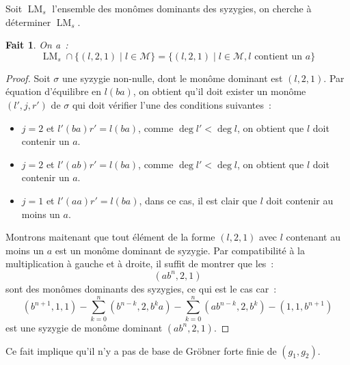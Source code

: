 \documentclass{article}
\newtheorem*{fact}{Fait}
\newcommand{\M}{\mathcal{M}}
\DeclareMathOperator{\LM}{LM}
\begin{document}
Soit $\LM_s$ l'ensemble des monômes dominants des syzygies, on cherche à déterminer $\LM_s$.
\begin{fact}
	On a~:
	$$\LM_s \cap \{(l, 2, 1) \;|\; l \in \M\} = \{(l, 2, 1) \;|\; l \in \M, l \mbox{ contient un } a\}$$
\end{fact}
\begin{proof}
	Soit $\sigma$ une syzygie non-nulle, dont le monôme dominant est $(l, 2, 1)$.
	Par équation d'équilibre en $l(ba)$, on obtient qu'il doit exister un monôme $(l', j, r')$ de $\sigma$ qui doit vérifier l'une des conditions suivantes~:
	\begin{itemize}
	\item $j = 2$ et $l'(ba)r' = l(ba)$, comme $\deg{l'} < \deg{l}$, on obtient que $l$ doit contenir un $a$.
	\item $j = 2$ et $l'(ab)r' = l(ba)$, comme $\deg{l'} < \deg{l}$, on obtient que $l$ doit contenir un $a$.
	\item $j = 1$ et $l'(aa)r' = l(ba)$, dans ce cas, il est clair que $l$ doit contenir au moins un $a$.
	\end{itemize}
	
	Montrons maitenant que tout élément de la forme $(l, 2, 1)$ avec $l$ contenant au moins un $a$ est un monôme dominant de syzygie.
	Par compatibilité à la multiplication à gauche et à droite, il suffit de montrer que les~:
	$$(ab^n, 2, 1)$$
	sont des monômes dominants des syzygies, ce qui est le cas car~:
	$$(b^{n + 1}, 1, 1) - \sum_{k = 0}^n (b^{n - k}, 2, b^k a)
	- \sum_{k = 0}^n (ab^{n - k}, 2, b^k) - (1, 1, b^{n + 1})$$
	est une syzygie de monôme dominant $(ab^n, 2, 1)$.	
\end{proof}

Ce fait implique qu'il n'y a pas de base de Gröbner forte finie de $(g_1, g_2)$.
\end{document}
